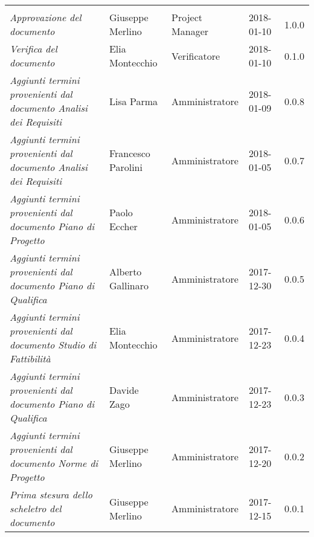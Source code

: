 \newpage 
\section*{}
\begin{table}[H]
	\centering
	\begin{tabular}{p{4cm}|C{3cm}|C{3cm}|R{2.5cm}|R{2cm}}
		
		 & & & & \\
		
		
		\emph{Approvazione del documento} & Giuseppe Merlino & Project Manager & 2018-01-10 & 1.0.0 \\
		\hline
		
		\emph{Verifica del documento} & Elia Montecchio & Verificatore & 2018-01-10 & 0.1.0 \\
		\hline
		
		\emph{Aggiunti termini provenienti dal documento Analisi dei Requisiti} & Lisa Parma & Amministratore & 2018-01-09 & 0.0.8 \\
		\hline
		
		\emph{Aggiunti termini provenienti dal documento Analisi dei Requisiti} & Francesco Parolini & Amministratore & 2018-01-05 & 0.0.7 \\
		\hline
		
		\emph{Aggiunti termini provenienti dal documento Piano di Progetto} & Paolo Eccher & Amministratore & 2018-01-05 & 0.0.6 \\
		\hline
		
		\emph{Aggiunti termini provenienti dal documento Piano di Qualifica} & Alberto Gallinaro & Amministratore & 2017-12-30 & 0.0.5 \\
		\hline
		
		\emph{Aggiunti termini provenienti dal documento Studio di Fattibilità} & Elia Montecchio & Amministratore & 2017-12-23 & 0.0.4 \\
		\hline
		
		\emph{Aggiunti termini provenienti dal documento Piano di Qualifica} & Davide Zago & Amministratore & 2017-12-23 & 0.0.3 \\
		\hline
		
		\emph{Aggiunti termini provenienti dal documento Norme di Progetto} & Giuseppe Merlino & Amministratore & 2017-12-20 & 0.0.2 \\
		\hline
		
		\emph{Prima stesura dello scheletro del documento} & Giuseppe Merlino & Amministratore & 2017-12-15 & 0.0.1 \\
		
	\end{tabular}
	
\end{table}


\clearpage